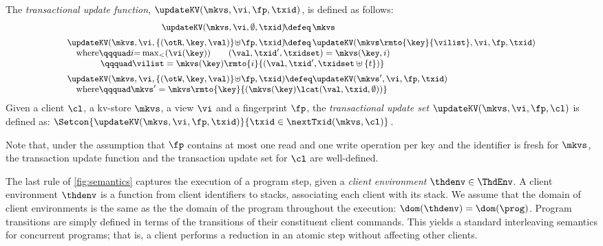 \begin{definition}
\label{eq:updatekv}
\label{def:updatekv}
The \emph{transactional update function},  $\updateKV(\mkvs, \vi, \fp, \txid)$,  is
defined as follows:
%
{%
\[%
\small
\begin{array}{@{} l @{}}
	\begin{array}{@{} r @{} l @{}}
		\updateKV(\mkvs, \vi, \emptyset, \txid) \!\defeq\,  & \mkvs \vspace{5pt}\\
	    \updateKV(\mkvs, \vi, \{(\otR, \key, \val)\} \!\uplus\! \fp, \txid) 
	    \!\defeq\, & 
	    \updateKV(\mkvs\rmto{\key}{\vilist},\vi, \fp, \txid)
	\end{array}\\
%	
	\quad\text{where} 
	\qqquad 
	i {=} \max_{<}(\vi(\key)) \qquad (\val, \txid', \txidset) = \mkvs(\key, i) \\
	\quad\phantom{where} 
	\qqquad 
	\vilist = \mkvs(\key)\rmto{i}{(\val, \txid', \txidset \uplus \{ t \})} \vspace{5pt}\\
%	
	\updateKV(\mkvs, \vi, \{(\otW, \key, \val)\} \!\uplus\! \fp, \txid) 
    	\defeq
    \updateKV(\mkvs', \vi, \fp, \txid) \\
%
 	\quad\text{where} 
	\qqquad 
	\mkvs' = \mkvs\rmto{\key}{ ( \mkvs(\key) \lcat (\val, \txid, \emptyset) ) }   
\end{array}
\]%
}%
%
Given a client $\cl$, a kv-store $\mkvs$, a view $\vi$ and a fingerprint $\fp$, 
the \emph{transactional update set} $\updateKV(\mkvs, \vi, \fp, \cl)$ is defined as:  
$\Setcon{\updateKV(\mkvs, \vi, \fp, \txid)}{\txid \in \nextTxid(\mkvs, \cl)}$.
\end{definition}

Note that,  under the assumption that $\fp$ contains at most one read and one write 
operation per key and the identifier is fresh for $\mkvs$, 
the transaction update function and the transaction update set for
$\cl$ are well-defined. 

The last rule of \cref{fig:semantics} captures the execution of a program step, 
given a \emph{client environment} $\thdenv \in \ThdEnv$. 
A client environment $\thdenv$ is a function from client identifiers to stacks, associating each client with its stack. 
We assume that the domain of client environments is the same as the
the domain of the program throughout the execution: 
$\dom(\thdenv) = \dom(\prog)$.
Program transitions are simply defined in terms of the transitions of
their constituent client commands. 
This  yields a  standard interleaving semantics for concurrent
programs; 
that is, 
a client performs a reduction in an atomic step without
affecting other clients. 
